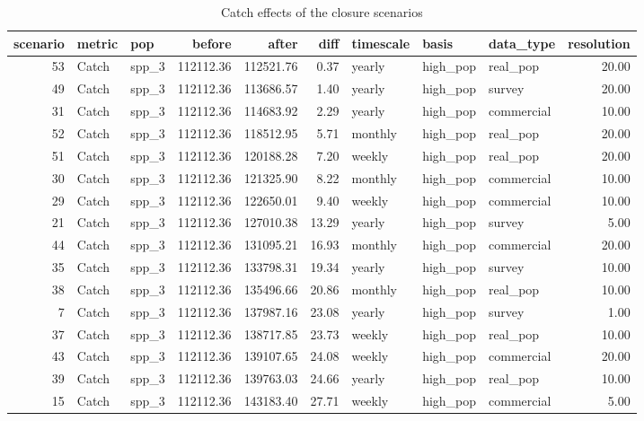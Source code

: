 \begin{longtable}{rllrrrlllr}
\caption{Catch effects of the closure scenarios} \\ 
  \hline
scenario & metric & pop & before & after & diff & timescale & basis & data\_type & resolution \\ 
  \hline
 53 & Catch & spp\_3 & 112112.36 & 112521.76 & 0.37 & yearly & high\_pop & real\_pop & 20.00 \\ 
   49 & Catch & spp\_3 & 112112.36 & 113686.57 & 1.40 & yearly & high\_pop & survey & 20.00 \\ 
   31 & Catch & spp\_3 & 112112.36 & 114683.92 & 2.29 & yearly & high\_pop & commercial & 10.00 \\ 
   52 & Catch & spp\_3 & 112112.36 & 118512.95 & 5.71 & monthly & high\_pop & real\_pop & 20.00 \\ 
   51 & Catch & spp\_3 & 112112.36 & 120188.28 & 7.20 & weekly & high\_pop & real\_pop & 20.00 \\ 
   30 & Catch & spp\_3 & 112112.36 & 121325.90 & 8.22 & monthly & high\_pop & commercial & 10.00 \\ 
   29 & Catch & spp\_3 & 112112.36 & 122650.01 & 9.40 & weekly & high\_pop & commercial & 10.00 \\ 
   21 & Catch & spp\_3 & 112112.36 & 127010.38 & 13.29 & yearly & high\_pop & survey & 5.00 \\ 
   44 & Catch & spp\_3 & 112112.36 & 131095.21 & 16.93 & monthly & high\_pop & commercial & 20.00 \\ 
   35 & Catch & spp\_3 & 112112.36 & 133798.31 & 19.34 & yearly & high\_pop & survey & 10.00 \\ 
   38 & Catch & spp\_3 & 112112.36 & 135496.66 & 20.86 & monthly & high\_pop & real\_pop & 10.00 \\ 
    7 & Catch & spp\_3 & 112112.36 & 137987.16 & 23.08 & yearly & high\_pop & survey & 1.00 \\ 
   37 & Catch & spp\_3 & 112112.36 & 138717.85 & 23.73 & weekly & high\_pop & real\_pop & 10.00 \\ 
   43 & Catch & spp\_3 & 112112.36 & 139107.65 & 24.08 & weekly & high\_pop & commercial & 20.00 \\ 
   39 & Catch & spp\_3 & 112112.36 & 139763.03 & 24.66 & yearly & high\_pop & real\_pop & 10.00 \\ 
   15 & Catch & spp\_3 & 112112.36 & 143183.40 & 27.71 & weekly & high\_pop & commercial & 5.00 \\ 

\end{longtable}

